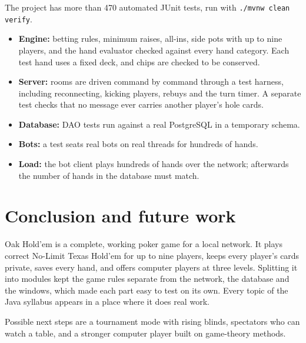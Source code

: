 \documentclass[12pt,a4paper]{article}
\newcommand{\cls}[1]{\texttt{#1}}
\begin{document}
The project has more than 470 automated JUnit tests, run with \cls{./mvnw clean verify}.
\begin{itemize}
\item \textbf{Engine:} betting rules, minimum raises, all-ins, side pots with up to nine
players, and the hand evaluator checked against every hand category. Each test hand uses a
fixed deck, and chips are checked to be conserved.
\item \textbf{Server:} rooms are driven command by command through a test harness, including
reconnecting, kicking players, rebuys and the turn timer. A separate test checks that no
message ever carries another player's hole cards.
\item \textbf{Database:} DAO tests run against a real PostgreSQL in a temporary schema.
\item \textbf{Bots:} a test seats real bots on real threads for hundreds of hands.
\item \textbf{Load:} the bot client plays hundreds of hands over the network; afterwards the
number of hands in the database must match.
\end{itemize}

\section{Conclusion and future work}

Oak Hold'em is a complete, working poker game for a local network. It plays correct No-Limit
Texas Hold'em for up to nine players, keeps every player's cards private, saves every hand,
and offers computer players at three levels. Splitting it into modules kept the game rules
separate from the network, the database and the windows, which made each part easy to test on
its own. Every topic of the Java syllabus appears in a place where it does real work.

Possible next steps are a tournament mode with rising blinds, spectators who can watch a
table, and a stronger computer player built on game-theory methods.
\end{document}
